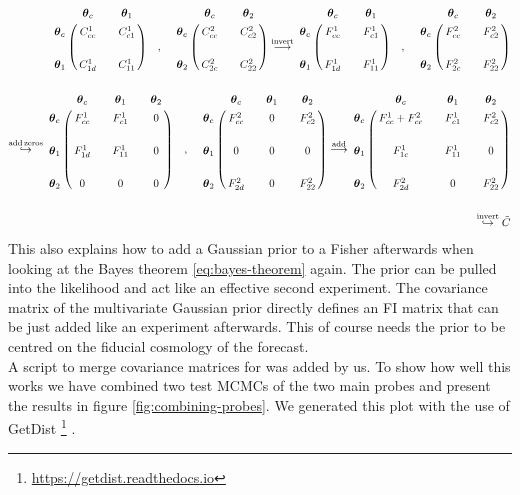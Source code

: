 \documentclass[../main.tex]{subfiles}
\begin{document}
\begin{align*}
    \bordermatrix{~ & \boldsymbol{\theta}_c && \boldsymbol{\theta}_1 \cr
    \boldsymbol{\theta}_c &C^1_{cc}&& C^1_{c1}\cr
    \cr
    \boldsymbol{\theta}_1 &C^1_{1d}&& C^1_{11}\cr } \quad ,\quad 
    \bordermatrix{~ & \boldsymbol{\theta}_c && \boldsymbol{\theta}_2 \cr
    \boldsymbol{\theta}_c &C^2_{cc}&& C^2_{c2}\cr
    \cr
    \boldsymbol{\theta}_2 &C^2_{2c}&& C^2_{22}\cr } \overset{\mathrm{invert}}{\longrightarrow}
    \bordermatrix{~ & \boldsymbol{\theta}_c && \boldsymbol{\theta}_1 \cr
    \boldsymbol{\theta}_c &F^1_{cc}&& F^1_{c1}\cr
    \cr
    \boldsymbol{\theta}_1 &F^1_{1d}&& F^1_{11}\cr } \quad ,\quad 
    \bordermatrix{~ & \boldsymbol{\theta}_c && \boldsymbol{\theta}_2 \cr
    \boldsymbol{\theta}_c &F^2_{cc}&& F^2_{c2}\cr
    \cr
    \boldsymbol{\theta}_2 &F^2_{2c}&& F^2_{22}\cr }\\
    \\
    \overset{\mathrm{add\,zeros}}{\hookrightarrow}
    \bordermatrix{~ & \boldsymbol{\theta}_c && \boldsymbol{\theta}_1  &&\boldsymbol{\theta}_2 \cr
    \boldsymbol{\theta}_c &F^1_{cc}&& F^1_{c1} && 0\cr
    \cr
    \boldsymbol{\theta}_1 &F^1_{1d}&& F^1_{11}&& 0\cr 
    \cr
    \boldsymbol{\theta}_2& 0&&0&&0} \quad,\quad 
    \bordermatrix{~ & \boldsymbol{\theta}_c && \boldsymbol{\theta}_1  &&\boldsymbol{\theta}_2 \cr
    \boldsymbol{\theta}_c &F^2_{cc}&&0  && F^2_{c2}\cr
    \cr
    \boldsymbol{\theta}_1 &0&& 0&& 0\cr 
    \cr
    \boldsymbol{\theta}_2& F^2_{2d}&&0&&F^2_{22}} \overset{\mathrm{add}}{\longrightarrow}
    \bordermatrix{~ & \boldsymbol{\theta}_c && \boldsymbol{\theta}_1  &&\boldsymbol{\theta}_2 \cr
    \boldsymbol{\theta}_c &F^1_{cc}+F^2_{cc}&&F^1_{c1}  && F^2_{c2}\cr
    \cr
    \boldsymbol{\theta}_1 &F^1_{1c}&& F^1_{11}&& 0\cr 
    \cr
    \boldsymbol{\theta}_2& F^2_{2d}&&0&&F^2_{22}}\\
    \\
    \overset{\mathrm{invert}}{\hookrightarrow} \tilde{C}
\end{align*}
This also explains how to add a Gaussian prior to a Fisher afterwards when looking at the Bayes theorem \ref{eq:bayes-theorem} again. The prior can be pulled into the likelihood and act like an effective second experiment. The covariance matrix of the multivariate Gaussian prior directly defines an FI matrix that can be just added like an experiment afterwards. This of course needs the prior to be centred on the fiducial cosmology of the forecast.\\
A script to merge covariance matrices for \montepython was added by us. To show how well this works we have combined two test MCMCs of the two main \Euclid probes and present the results in figure \ref{fig:combining-probes}. We generated this plot with the use of GetDist \footnote{\href{https://getdist.readthedocs.io}{https://getdist.readthedocs.io}} \cite{Lewis:2019xzd}.
\end{document}
